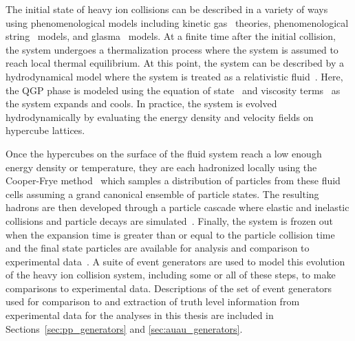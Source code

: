The initial state of heavy ion collisions can be described in a variety of ways using phenomenological models including kinetic gas~\cite{kinetic_initial_state_Kurkela:2015qoa} theories, phenomenological string~\cite{hijing,ampt,epos} models, and glasma~\cite{ipglasma_Schenke:2012wb} models.
At a finite time after the initial collision, the system undergoes a thermalization process where the system is assumed to reach local thermal equilibrium.
At this point, the system can be described by a hydrodynamical model where the system is treated as a relativistic fluid~\cite{hydro_Noronha-Hostler:2013gga,music_Schenke:2010nt,music_Gale:2012rq,music_Paquet:2015lta}.
Here, the QGP phase is modeled using the equation of state~\cite{eos_borsanyi2010qcd} and viscosity terms~\cite{viscosity_Bernhard:2019bmu,Dore:2020jye,McLaughlin:2021dph} as the system expands and cools.
In practice, the system is evolved hydrodynamically by evaluating the energy density and velocity fields on hypercube lattices.

Once the hypercubes on the surface of the fluid system reach a low enough energy density or temperature, they are each hadronized locally using the Cooper-Frye method~\cite{cooper_frye_1974} which samples a distribution of particles from these fluid cells assuming a grand canonical ensemble of particle states.
The resulting hadrons are then developed through a particle cascade where elastic and inelastic collisions and particle decays are simulated~\cite{urqmd_Bass:1998ca,urqmd_Bleicher:1999xi,SMASH:2016zqf}.
Finally, the system is frozen out when the expansion time is greater than or equal to the particle collision time and the final state particles are available for analysis and comparison to experimental data~\cite{kinetic_freezeout}.
A suite of event generators are used to model this evolution of the heavy ion collision system, including some or all of these steps, to make comparisons to experimental data.
Descriptions of the set of event generators used for comparison to and extraction of truth level information from experimental data for the analyses in this thesis are included in Sections~\ref{sec:pp_generators} and \ref{sec:auau_generators}.

